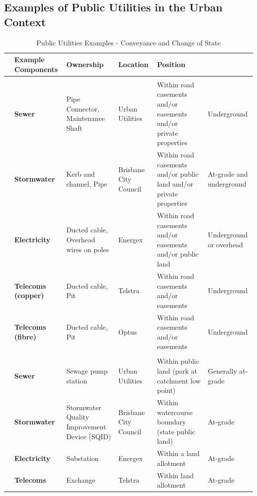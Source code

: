 \documentclass{report}
\begin{document}
	\subsection{Examples of Public Utilities in the Urban Context}

	\begin{table}[h!]
	\centering
	\caption{Public Utilities Examples - Conveyance and Change of State}
	\renewcommand{\arraystretch}{1.5}
	\small
	\begin{tabular}{|>{\bfseries}l|>{\bfseries}p{2.5cm}|p{3.5cm}|p{2cm}|p{3.5cm}|p{2cm}|}
	\toprule
	\rowcolor{blue!30}
	\multicolumn{2}{|c|}{\textbf{Type}} & \textbf{Example Components} & \textbf{Ownership} & \textbf{Location} & \textbf{Position} \\
	\midrule
	\multicolumn{6}{|c|}{\cellcolor{blue!15}\textbf{CONVEYANCE PUBLIC UTILITIES}} \\
	\midrule
	\multirow{5}{*}{\rotatebox[origin=c]{90}{\textbf{Conveyance}}} 
	& Sewer & Pipe Connector, Maintenance Shaft & Urban Utilities & Within road casements and/or easements and/or private properties & Underground \\
	\cline{2-6}
	& Stormwater & Kerb and channel, Pipe & Brisbane City Council & Within road casements and/or public land and/or private properties & At-grade and underground \\
	\cline{2-6}
	& Electricity & Ducted cable, Overhead wires on poles & Energex & Within road casements and/or easements and/or public land & Underground or overhead \\
	\cline{2-6}
	& Telecoms (copper) & Ducted cable, Pit & Telstra & Within road casements and/or easements & Underground \\
	\cline{2-6}
	& Telecoms (fibre) & Ducted cable, Pit & Optus & Within road casements and/or easements & Underground \\
	\midrule
	\multicolumn{6}{|c|}{\cellcolor{green!15}\textbf{CHANGE OF STATE PUBLIC UTILITIES}} \\
	\midrule
	\multirow{4}{*}{\rotatebox[origin=c]{90}{\textbf{Change}}} 
	& Sewer & Sewage pump station & Urban Utilities & Within public land (park at catchment low point) & Generally at-grade \\
	\cline{2-6}
	& Stormwater & Stormwater Quality Improvement Device (SQID) & Brisbane City Council & Within watercourse boundary (state public land) & At-grade \\
	\cline{2-6}
	& Electricity & Substation & Energex & Within a land allotment & At-grade \\
	\cline{2-6}
	& Telecoms & Exchange & Telstra & Within land allotment & At-grade \\
	\bottomrule
	\end{tabular}
	\end{table}
	
\end{document}
